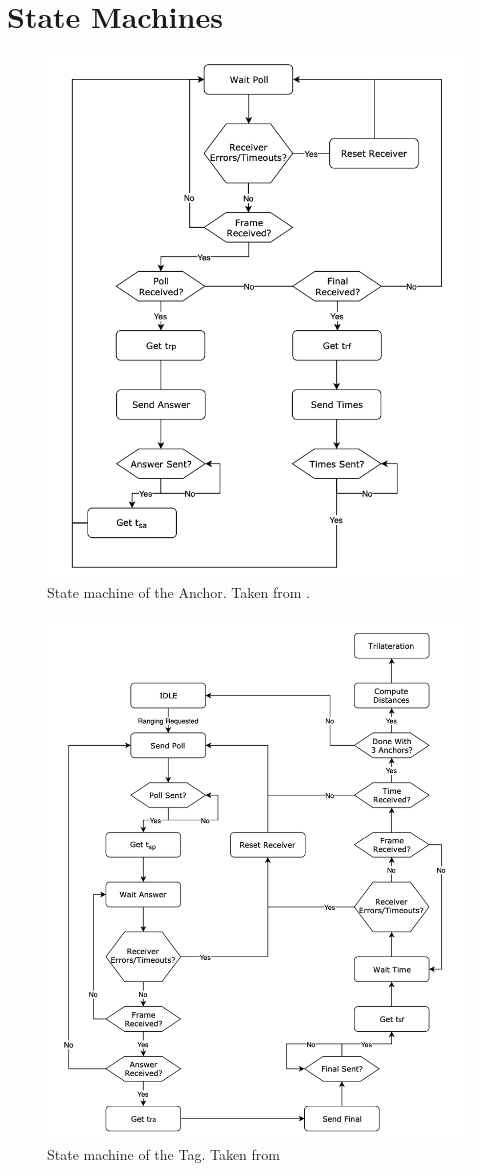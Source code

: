 \chapter{State Machines}
\label{app:state_machine}

\begin{figure}[H]
\centering
\includegraphics[width=.9\linewidth]{Images/state_machine_anchor.png}
\caption{State machine of the Anchor. Taken from  \cite{hannotier2019indoor}.\label{fig:state_anc}}
\end{figure}

\begin{figure}[H]
\centering
\includegraphics[width=.9\linewidth]{Images/state_machine_tag.png}
\caption{State machine of the Tag. Taken from  \cite{hannotier2019indoor}\label{fig:state_tag}}
\end{figure}